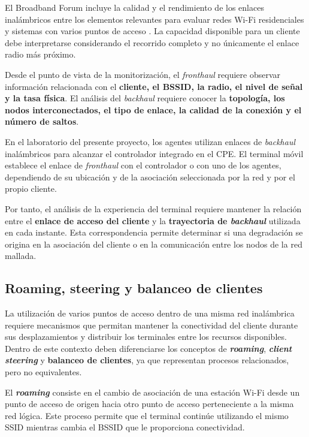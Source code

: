 El Broadband Forum incluye la calidad y el rendimiento de los enlaces
inalámbricos entre los elementos relevantes para evaluar redes Wi-Fi
residenciales y sistemas con varios puntos de acceso
\cite{bbf_tr398_i3c1}. La capacidad disponible para un cliente debe
interpretarse considerando el recorrido completo y no únicamente el
enlace radio más próximo.

Desde el punto de vista de la monitorización, el
\textit{fronthaul} requiere observar información relacionada con el
\textbf{cliente, el BSSID, la radio, el nivel de señal y la tasa física}.
El análisis del \textit{backhaul} requiere conocer la
\textbf{topología, los nodos interconectados, el tipo de enlace, la
calidad de la conexión y el número de saltos}.

En el laboratorio del presente proyecto, los agentes utilizan enlaces de
\textit{backhaul} inalámbricos para alcanzar el controlador integrado en
el CPE. El terminal móvil establece el enlace de
\textit{fronthaul} con el controlador o con uno de los agentes,
dependiendo de su ubicación y de la asociación seleccionada por la red y
por el propio cliente.

Por tanto, el análisis de la experiencia del terminal requiere mantener
la relación entre el \textbf{enlace de acceso del cliente} y la
\textbf{trayectoria de \textit{backhaul}} utilizada en cada instante.
Esta correspondencia permite determinar si una degradación se origina en
la asociación del cliente o en la comunicación entre los nodos de la red
mallada.

\subsection{Roaming, steering y balanceo de clientes}
\label{subsec:roaming-steering-balanceo-clientes}
La utilización de varios puntos de acceso dentro de una misma red
inalámbrica requiere mecanismos que permitan mantener la conectividad del
cliente durante sus desplazamientos y distribuir los terminales entre los
recursos disponibles. Dentro de este contexto deben diferenciarse los
conceptos de \textbf{\textit{roaming}},
\textbf{\textit{client steering}} y
\textbf{balanceo de clientes}, ya que representan procesos relacionados,
pero no equivalentes.

El \textbf{\textit{roaming}} consiste en el cambio de asociación de una
estación Wi-Fi desde un punto de acceso de origen hacia otro punto de
acceso perteneciente a la misma red lógica. Este proceso permite que el
terminal continúe utilizando el mismo SSID mientras cambia el BSSID que
le proporciona conectividad.

